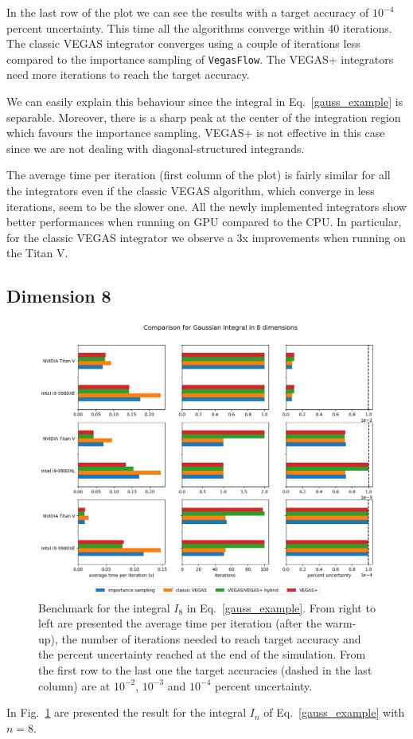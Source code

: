\documentclass[../main/main.tex]{subfiles}
\begin{document}
In the last row of the plot we can see the results with a target accuracy of $10^{-4}$ percent uncertainty. 
This time all the algorithms converge within 40 iterations. The classic VEGAS integrator converges using a couple of  iterations less compared to the importance sampling of \texttt{VegasFlow}. The VEGAS+ integrators need more iterations to reach the target accuracy.

We can easily explain this behaviour since the integral in Eq.~\ref{gauss_example} is separable. Moreover, there is a sharp peak at the center of the integration region which favours the importance sampling. VEGAS+ is not effective in this case since we are not dealing with diagonal-structured integrands.

The average time per iteration (first column of the plot) is fairly similar for all the integrators even if the classic VEGAS algorithm, which converge in less iterations, seem to be the slower one. All the newly implemented integrators show better performances when running on GPU compared to the CPU. In particular, for the classic VEGAS integrator we observe a 3x improvements when running on the Titan V.
\subsection{Dimension 8}
\begin{figure}
	\centering
	\includegraphics[width=\textwidth]{../images/gauss8d_final.png}
	\caption{Benchmark  for the integral $I_8$ in Eq.~\ref{gauss_example}. From right to left are presented the average time per iteration (after the warm-up), the number of iterations needed to reach target accuracy and the percent uncertainty reached at the end of the simulation. From the first row to the last one the target accuracies (dashed in the last column) are at $10^{-2}$, $10^{-3}$ and $10^{-4}$ percent uncertainty.}
	\label{gauss8d}
\end{figure}
In Fig.~\ref{gauss8d} are presented the result for the integral $I_n$ of Eq.~\ref{gauss_example} with $n = 8$.
\end{document}
